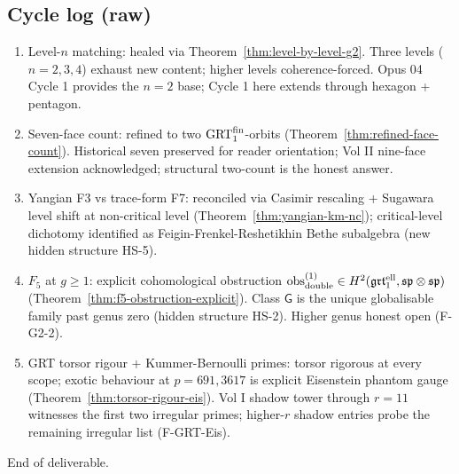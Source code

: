 \subsection*{Cycle log (raw)}

\begin{enumerate}
\item[C1] Level-$n$ matching: healed via Theorem~\ref{thm:level-by-level-g2}.
   Three levels ($n=2, 3, 4$) exhaust new content; higher levels
   coherence-forced. Opus 04 Cycle 1 provides the $n=2$ base;
   Cycle 1 here extends through hexagon + pentagon.

\item[C2] Seven-face count: refined to two $\mathrm{GRT}_1^{\mathrm{fin}}$-orbits
   (Theorem~\ref{thm:refined-face-count}). Historical seven preserved
   for reader orientation; Vol II nine-face extension acknowledged;
   structural two-count is the honest answer.

\item[C3] Yangian F3 vs trace-form F7: reconciled via Casimir rescaling
   + Sugawara level shift at non-critical level
   (Theorem~\ref{thm:yangian-km-nc}); critical-level dichotomy
   identified as Feigin-Frenkel-Reshetikhin Bethe subalgebra (new
   hidden structure HS-5).

\item[C4] $F_5$ at $g \ge 1$: explicit cohomological obstruction
   $\mathrm{obs}^{(1)}_{\mathrm{double}} \in H^2(\mathfrak{grt}_1^{\mathrm{ell}}, \mathfrak{sp} \otimes \mathfrak{sp})$
   (Theorem~\ref{thm:f5-obstruction-explicit}). Class $\mathsf{G}$ is
   the unique globalisable family past genus zero (hidden structure
   HS-2). Higher genus honest open (F-G2-2).

\item[C5] GRT torsor rigour + Kummer-Bernoulli primes: torsor rigorous
   at every scope; exotic behaviour at $p = 691, 3617$ is explicit
   Eisenstein phantom gauge (Theorem~\ref{thm:torsor-rigour-eis}). Vol
   I shadow tower through $r = 11$ witnesses the first two irregular
   primes; higher-$r$ shadow entries probe the remaining irregular
   list (F-GRT-Eis).
\end{enumerate}

End of deliverable.
